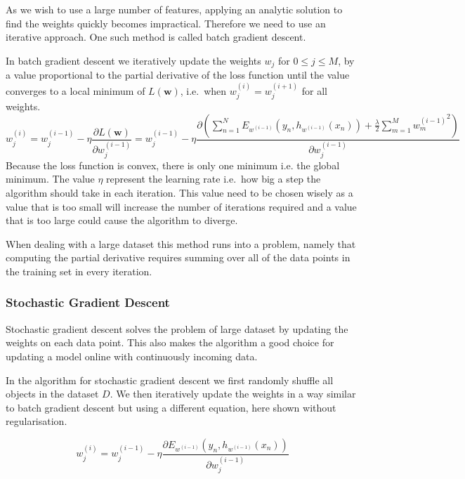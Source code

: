 As we wish to use a large number of features, applying an analytic solution to find the weights quickly becomes impractical.
Therefore we need to use an iterative approach.
One such method is called batch gradient descent.

In batch gradient descent we iteratively update the weights $w_j$ for $0 \leq j \leq M$, by a value proportional to the partial derivative of the loss function until the value converges to a local minimum of $L(\textbf{w})$, i.e.\ when $w_{j}^{(i)} = w_j^{(i+1)}$ for all weights.
\[w_j^{(i)} = w_j^{(i-1)} - \eta \frac{\partial L(\mathbf{w})}{\partial w_j^{(i-1)}}
       = w_{j}^{(i-1)} - \eta \frac{\partial \left(\displaystyle\sum_{n=1}^N E_{w^{(i-1)}}(y_n, h_{w^{(i-1)}}(x_n)) + \frac{\lambda}{2}\sum_{m=1}^M {w^{(i-1)}_m}^2 \right) }{\partial w_j^{(i-1)}} \]  
Because the loss function is convex, there is only one minimum i.e. the global minimum. 
The value $\eta$ represent the learning rate i.e.\ how big a step the algorithm should take in each iteration.
This value need to be chosen wisely as a value that is too small will increase the number of iterations required and a value that is too large could cause the algorithm to diverge.

When dealing with a large dataset this method runs into a problem, namely that computing the partial derivative requires summing over all of the data points in the training set in every iteration. 

\subsubsection{Stochastic Gradient Descent}\label{sec:stochastic}

Stochastic gradient descent solves the problem of large dataset by updating the weights on each data point.
This also makes the algorithm a good choice for updating a model online with continuously incoming data. 

In the algorithm for stochastic gradient descent we first randomly shuffle all objects in the dataset $D$.
We then iteratively update the weights in a way similar to batch gradient descent but using a different equation, here shown without regularisation.

\[ w_j^{(i)} = w_j^{(i-1)} - \eta \frac{\partial E_{w^{(i-1)}}(y_n, h_{w^{(i-1)}}(x_n))}{\partial w_j^{(i-1)}} \]

